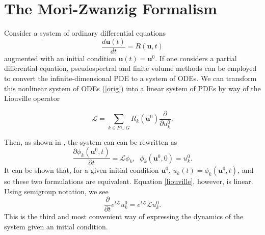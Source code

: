 \documentclass{article}
\begin{document}
\section{The Mori-Zwanzig Formalism}

Consider a system of ordinary differential equations
\begin{equation}
\frac{d \mathbf{u}(t)}{dt} = R(\mathbf{u},t)\label{orig}
\end{equation}
augmented with an initial condition $\mathbf{u}(t)=\mathbf{u}^0$. If one considers a partial differential equation, pseudospectral and finite volume methods can be employed to convert the infinite-dimensional PDE to a system of ODEs. We can transform this nonlinear system of ODEs (\ref{orig}) into a linear system of PDEs by way of the Liouville operator

\begin{equation}
\mathcal{L}=\sum_{k\in F\cup G} R_k(\mathbf{u}^0)\frac{\partial}{\partial u_k^0}.\label{L}
\end{equation}

Then, as shown in \cite{chorin2000optimal}, the system can can be rewritten as
\begin{equation}
\frac{\partial \phi_k(\mathbf{u}^0,t)}{\partial t} = \mathcal{L}\phi_k,\;\; \phi_k(\mathbf{u}^0,0)=u_k^0.\label{liouville}
\end{equation}
It can be shown that, for a given initial condition $\mathbf{u}^0$, $u_k(t) = \phi_k(\mathbf{u}^0,t)$, and so these two formulations are equivalent. Equation \ref{liouville}, however, is linear. Using semigroup notation, we see
\begin{equation}
\frac{\partial}{\partial t}e^{t\mathcal{L}}u_k^0 = e^{t\mathcal{L}}\mathcal{L}u_k^0.\label{semigroup}
\end{equation}This is the third and most convenient way of expressing the dynamics of the system given an initial condition. 
\end{document}
